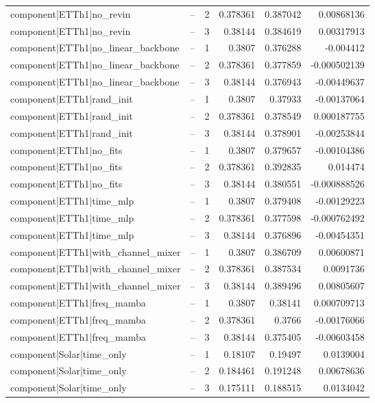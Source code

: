 \begin{longtable}{llrrrr}
component|ETTh1|no\_revin & -- & 2 & 0.378361 & 0.387042 & 0.00868136 \\
component|ETTh1|no\_revin & -- & 3 & 0.38144 & 0.384619 & 0.00317913 \\
component|ETTh1|no\_linear\_backbone & -- & 1 & 0.3807 & 0.376288 & -0.004412 \\
component|ETTh1|no\_linear\_backbone & -- & 2 & 0.378361 & 0.377859 & -0.000502139 \\
component|ETTh1|no\_linear\_backbone & -- & 3 & 0.38144 & 0.376943 & -0.00449637 \\
component|ETTh1|rand\_init & -- & 1 & 0.3807 & 0.37933 & -0.00137064 \\
component|ETTh1|rand\_init & -- & 2 & 0.378361 & 0.378549 & 0.000187755 \\
component|ETTh1|rand\_init & -- & 3 & 0.38144 & 0.378901 & -0.00253844 \\
component|ETTh1|no\_fits & -- & 1 & 0.3807 & 0.379657 & -0.00104386 \\
component|ETTh1|no\_fits & -- & 2 & 0.378361 & 0.392835 & 0.014474 \\
component|ETTh1|no\_fits & -- & 3 & 0.38144 & 0.380551 & -0.000888526 \\
component|ETTh1|time\_mlp & -- & 1 & 0.3807 & 0.379408 & -0.00129223 \\
component|ETTh1|time\_mlp & -- & 2 & 0.378361 & 0.377598 & -0.000762492 \\
component|ETTh1|time\_mlp & -- & 3 & 0.38144 & 0.376896 & -0.00454351 \\
component|ETTh1|with\_channel\_mixer & -- & 1 & 0.3807 & 0.386709 & 0.00600871 \\
component|ETTh1|with\_channel\_mixer & -- & 2 & 0.378361 & 0.387534 & 0.0091736 \\
component|ETTh1|with\_channel\_mixer & -- & 3 & 0.38144 & 0.389496 & 0.00805607 \\
component|ETTh1|freq\_mamba & -- & 1 & 0.3807 & 0.38141 & 0.000709713 \\
component|ETTh1|freq\_mamba & -- & 2 & 0.378361 & 0.3766 & -0.00176066 \\
component|ETTh1|freq\_mamba & -- & 3 & 0.38144 & 0.375405 & -0.00603458 \\
component|Solar|time\_only & -- & 1 & 0.18107 & 0.19497 & 0.0139004 \\
component|Solar|time\_only & -- & 2 & 0.184461 & 0.191248 & 0.00678636 \\
component|Solar|time\_only & -- & 3 & 0.175111 & 0.188515 & 0.0134042 \\

\end{longtable}

